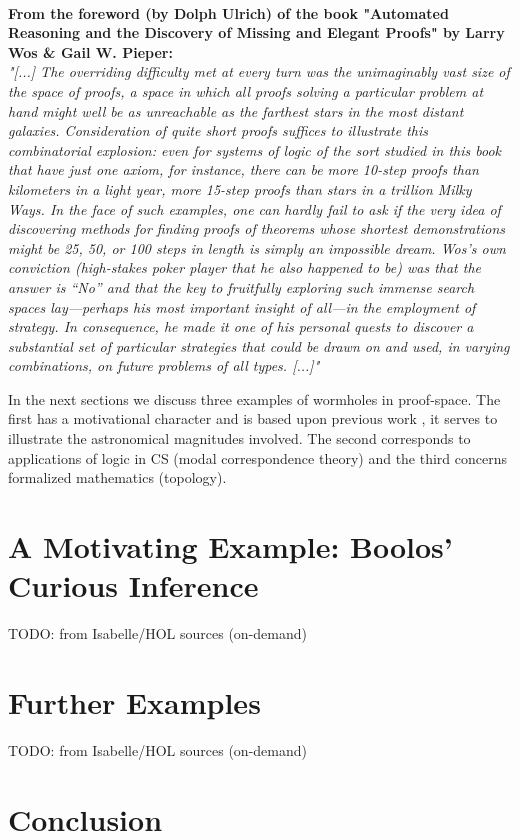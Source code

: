 \documentclass{article}
\begin{document}
\\
\textbf{From the foreword (by Dolph Ulrich) of the book "Automated Reasoning and the Discovery of Missing and Elegant Proofs" by Larry Wos \& Gail W. Pieper:}
\\
\textit{"[...] The overriding difficulty met at every turn was the unimaginably vast size of the space of proofs, a space in which all proofs solving a particular problem at hand might well be as unreachable as the farthest stars in the most distant galaxies. Consideration of quite short proofs suffices to illustrate this combinatorial explosion: even for systems of logic of the sort studied in this book that have just one axiom, for instance, there can be more 10-step proofs than kilometers in a light year, more 15-step proofs than stars in a trillion Milky Ways.
In the face of such examples, one can hardly fail to ask if the very idea of discovering methods for finding proofs of theorems whose shortest demonstrations might be 25, 50, or 100 steps in length is simply an impossible dream. Wos’s own conviction (high-stakes poker player that he also happened to be) was that the answer is “No” and that the key to fruitfully exploring such immense search spaces lay—perhaps his most important insight of all—in the employment of strategy. In consequence, he made it one of his personal quests to discover a substantial set of particular strategies that could be drawn on and used, in varying combinations, on future problems of all types. [...]"}

In the next sections we discuss three examples of wormholes in proof-space. The first has a motivational character and is based upon previous work \cite{IGPL-paper}, it serves to illustrate the astronomical magnitudes involved. The second corresponds to applications of logic in CS (modal correspondence theory) and the third concerns formalized mathematics (topology).


\section{A Motivating Example: Boolos' Curious Inference}

TODO: from Isabelle/HOL sources (on-demand)

\section{Further Examples}
TODO: from Isabelle/HOL sources (on-demand)

\section{Conclusion}
\end{document}
